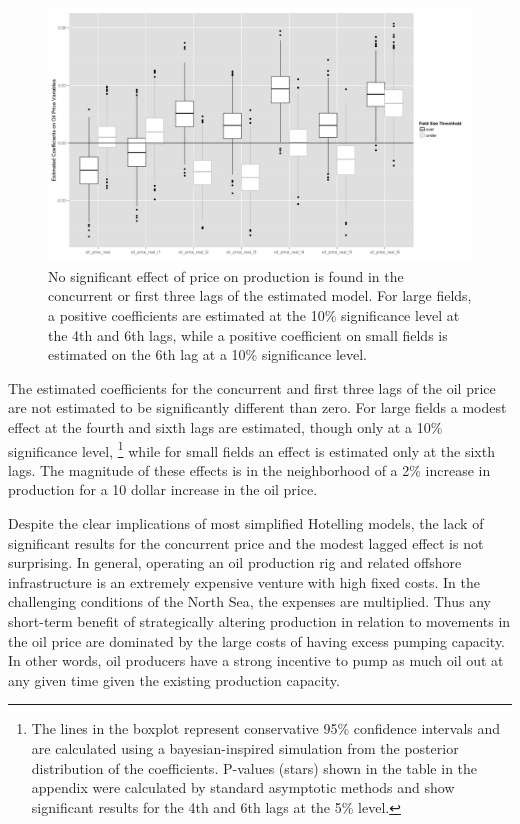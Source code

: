 \documentclass[12pt]{article}
\begin{document}
\begin{figure}
	\includegraphics[width=1\textwidth]{figures/gam_price_6_print.png}
	\caption{No significant effect of price on production is found in the concurrent or first three lags of the estimated model.  For large fields, a positive coefficients are estimated at the 10\% significance level at the 4th and 6th lags, while a positive coefficient on small fields is estimated on the 6th lag at a 10\% significance level.}
	\label{gam_price_dirty_box}
\end{figure}

The estimated coefficients for the concurrent and first three lags of the oil price are not estimated to be significantly different than zero.  For large fields a modest effect at the fourth and sixth lags are estimated, though only at a 10\% significance level, \footnote{The lines in the boxplot represent conservative 95\% confidence intervals and are calculated using a bayesian-inspired simulation from the posterior distribution of the coefficients.  P-values (stars) shown in the table in the appendix were calculated by standard asymptotic methods and show significant results for the 4th and 6th lags at the 5\% level.} while for small fields an effect is estimated only at the sixth lags. The magnitude of these effects is in the neighborhood of a 2\% increase in production for a 10 dollar increase in the oil price. 

Despite the clear implications of most simplified Hotelling models, the lack of significant results for the concurrent price and the modest lagged effect is not surprising. In general, operating an oil production rig and related offshore infrastructure is an extremely expensive venture with high fixed costs.  In the challenging conditions of the North Sea, the expenses are multiplied.  Thus any short-term benefit of strategically altering production in relation to movements in the oil price are dominated by the large costs of having excess pumping capacity.  In other words, oil producers have a strong incentive to pump as much oil out at any given time given the existing production capacity.
\end{document}
